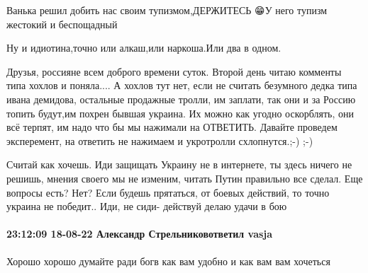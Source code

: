 Ванька решил добить нас своим тупизмом,ДЕРЖИТЕСЬ 😁У него тупизм жестокий и беспощадный 🤗😅

Ну и идиотина,точно или алкаш,или наркоша.Или два в одном.


Друзья, россияне всем доброго времени суток. Второй день читаю комменты типа
хохлов и поняла.... А хохлов тут нет, если не считать безумного дедка типа
ивана демидова, остальные продажные тролли, им заплати, так они и за Россию
топить будут,им похрен бывшая украина. Их можно как угодно оскорблять, они всё
терпят, им надо что бы мы нажимали на ОТВЕТИТЬ. Давайте проведем эксперемент,
на ответить не нажимаем и укротролли схлопнутся.;-) ;-)


Считай как хочешь. Иди защищать Украину не в интернете, ты здесь ничего не
решишь, мнения своего мы не изменим, читать Путин правильно все сделал. Еще
вопросы есть? Нет? Если будешь прятаться, от боевых действий, то точно украина
не победит.. Иди, не сиди- действуй делаю удачи в бою



\paragraph{23:12:09 18-08-22 Александр Стрельниковответил vasja}

Хорошо хорошо думайте ради богв как вам удобно и как вам вам хочеться
